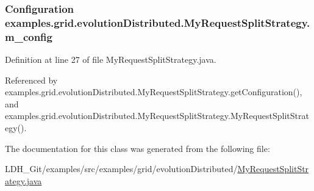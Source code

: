 \hypertarget{classexamples_1_1grid_1_1evolution_distributed_1_1_my_request_split_strategy_adf60edf08f37e853c63dfaa3c0b6622f}{
\subsubsection[{m\-\_\-config}]{\setlength{\rightskip}{0pt plus 5cm}Configuration examples.\-grid.\-evolution\-Distributed.\-My\-Request\-Split\-Strategy.\-m\-\_\-config\hspace{0.3cm}{\ttfamily [private]}}}\label{classexamples_1_1grid_1_1evolution_distributed_1_1_my_request_split_strategy_adf60edf08f37e853c63dfaa3c0b6622f}


Definition at line 27 of file My\-Request\-Split\-Strategy.\-java.



Referenced by examples.\-grid.\-evolution\-Distributed.\-My\-Request\-Split\-Strategy.\-get\-Configuration(), and examples.\-grid.\-evolution\-Distributed.\-My\-Request\-Split\-Strategy.\-My\-Request\-Split\-Strategy().



The documentation for this class was generated from the following file\-:\begin{DoxyCompactItemize}
\item 
L\-D\-H\-\_\-\-Git/examples/src/examples/grid/evolution\-Distributed/\hyperlink{evolution_distributed_2_my_request_split_strategy_8java}{My\-Request\-Split\-Strategy.\-java}\end{DoxyCompactItemize}
